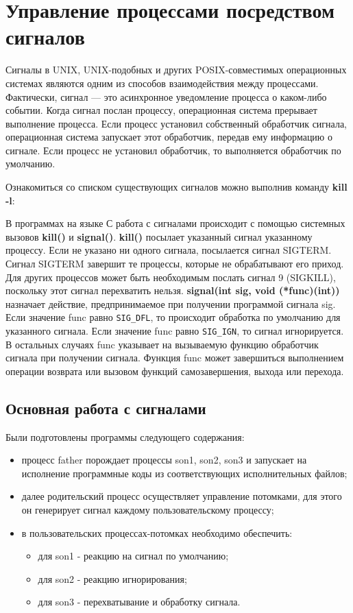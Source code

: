 \documentclass[a4paper]{article}
\begin{document}
\section{Управление процессами посредством сигналов}
	Сигналы в UNIX, UNIX-подобных и других POSIX-совместимых операционных системах являются одним из способов взаимодействия между процессами. Фактически, сигнал --- это асинхронное уведомление процесса о каком-либо событии. Когда сигнал послан процессу, операционная система прерывает выполнение процесса. Если процесс установил собственный обработчик сигнала, операционная система запускает этот обработчик, передав ему информацию о сигнале. Если процесс не установил обработчик, то выполняется обработчик по умолчанию.
	
	Ознакомиться со списком существующих сигналов можно выполнив команду \textbf{kill -l}:
	
	
	В программах на языке С работа с сигналами происходит с помощью системных вызовов \textbf{kill()} и \textbf{signal()}. \textbf{kill()} посылает указанный сигнал указанному процессу. Если не указано ни одного сигнала, посылается сигнал SIGTERM. Сигнал SIGTERM завершит те процессы, которые не обрабатывают его приход. Для других процессов может быть необходимым послать сигнал 9 (SIGKILL), поскольку этот сигнал перехватить нельзя. \textbf{signal(int sig, void (*func)(int))} назначает действие, предпринимаемое при получении программой сигнала sig. Если значение func равно \texttt{SIG\_DFL}, то происходит обработка по умолчанию для указанного сигнала. Если значение func равно \texttt{SIG\_IGN}, то сигнал игнорируется. В остальных случаях func указывает на вызываемую функцию обработчик сигнала при получении сигнала. Функция func может завершиться выполнением операции возврата или вызовом функций самозавершения, выхода или перехода.
	\subsection{Основная работа с сигналами}	
	Были подготовлены программы следующего содержания: 
	\begin{itemize}
		\item процесс father порождает процессы son1, son2, son3 и запускает на исполнение программные коды из соответствующих исполнительных файлов; 
		\item далее родительский процесс осуществляет управление потомками, для этого он генерирует сигнал каждому пользовательскому процессу; 
		\item в пользовательских процессах-потомках необходимо обеспечить:
			\begin{itemize}
				\item для son1 - реакцию на сигнал по умолчанию; 
				\item для son2 - реакцию игнорирования; 
				\item для son3 - перехватывание и обработку сигнала.		
			\end{itemize}	
	\end{itemize} 
	
\end{document}
